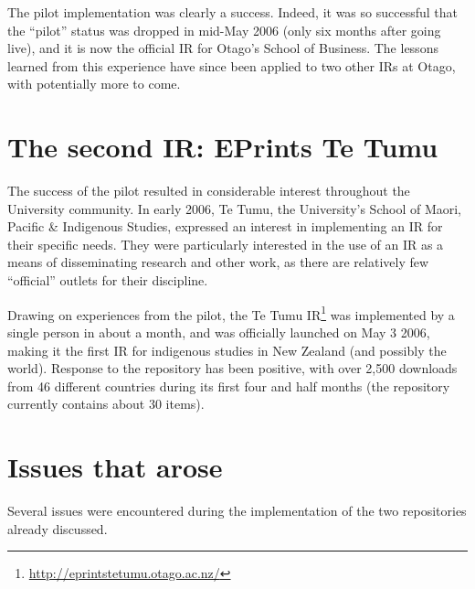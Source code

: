 \documentclass[12pt,pdftex,a4paper,titlepage]{article}
\begin{document}
The pilot implementation was clearly a success. Indeed, it was so successful that the ``pilot'' status was dropped in mid-May 2006 (only six months after going live), and it is now the official IR for Otago's School of Business. The lessons learned from this experience have since been applied to two other IRs at Otago, with potentially more to come.


\section{The second IR: EPrints Te Tumu}

The success of the pilot resulted in considerable interest throughout the University community. In early 2006, Te Tumu, the University's School of Maori, Pacific \& Indigenous Studies, expressed an interest in implementing an IR for their specific needs. They were particularly interested in the use of an IR as a means of disseminating research and other work, as there are relatively few ``official'' outlets for their discipline.

Drawing on experiences from the pilot, the Te Tumu IR\footnote{\url{http://eprintstetumu.otago.ac.nz/}} was implemented by a single person in about a month, and was officially launched on May 3 2006, making it the first IR for indigenous studies in New Zealand (and possibly the world). Response to the repository has been positive, with over 2,500 downloads from 46 different countries during its first four and half months (the repository currently contains about 30 items).


\section{Issues that arose}

Several issues were encountered during the implementation of the two repositories already discussed.
\end{document}
